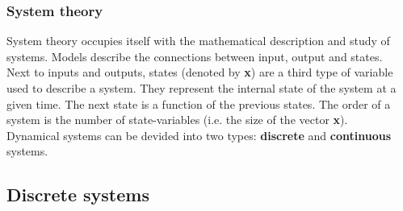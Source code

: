 \documentclass{beamer}
\begin{document}
\begin{frame}
\frametitle{System theory}
System theory occupies itself with the mathematical description and study of systems.
Models describe the connections between input, output and states.\\
\bigskip
Next to inputs and outputs, states (denoted by \textbf x) are a third type of variable used to describe a system. They represent the internal state of the system at a given time. The next state is a function of the previous states.
The order of a system is the number of state-variables (i.e. the size of the vector \textbf x).\\
\bigskip
Dynamical systems can be devided into two types: \textbf{discrete} and \textbf{continuous} systems.
\end{frame}

\subsection{Discrete systems} 
\end{document}
